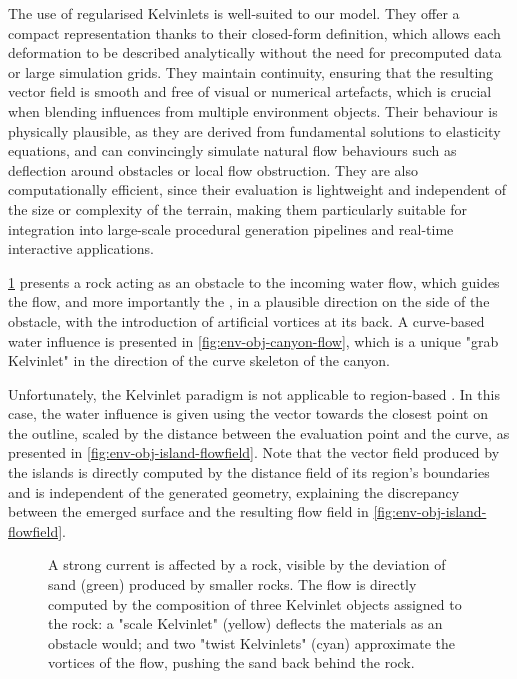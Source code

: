 The use of regularised Kelvinlets is well-suited to our model. They offer a compact representation thanks to their closed-form definition, which allows each deformation to be described analytically without the need for precomputed data or large simulation grids. They maintain continuity, ensuring that the resulting vector field is smooth and free of visual or numerical artefacts, which is crucial when blending influences from multiple environment objects. Their behaviour is physically plausible, as they are derived from fundamental solutions to elasticity equations, and can convincingly simulate natural flow behaviours such as deflection around obstacles or local flow obstruction. They are also computationally efficient, since their evaluation is lightweight and independent of the size or complexity of the terrain, making them particularly suitable for integration into large-scale procedural generation pipelines and real-time interactive applications.

\cref{fig:env-obj-rock-with-kelvinlets} presents a rock acting as an obstacle to the incoming water flow, which guides the flow, and more importantly the , in a plausible direction on the side of the obstacle, with the introduction of artificial vortices at its back. A curve-based water influence is presented in \cref{fig:env-obj-canyon-flow}, which is a unique "grab Kelvinlet" in the direction of the curve skeleton of the canyon.

Unfortunately, the Kelvinlet paradigm is not applicable to region-based . In this case, the water influence is given using the vector towards the closest point on the outline, scaled by the distance between the evaluation point and the curve, as presented in \cref{fig:env-obj-island-flowfield}. Note that the vector field produced by the islands is directly computed by the distance field of its region's boundaries and is independent of the generated geometry, explaining the discrepancy between the emerged surface and the resulting flow field in \cref{fig:env-obj-island-flowfield}.

\begin{figure}
\caption{A strong current is affected by a rock, visible by the deviation of sand (green) produced by smaller rocks. The flow is directly computed by the composition of three Kelvinlet objects assigned to the rock: a "scale Kelvinlet" (yellow) deflects the materials as an obstacle would; and two "twist Kelvinlets" (cyan) approximate the vortices of the flow, pushing the sand back behind the rock.}
\label{fig:env-obj-rock-with-kelvinlets}
\end{figure}

